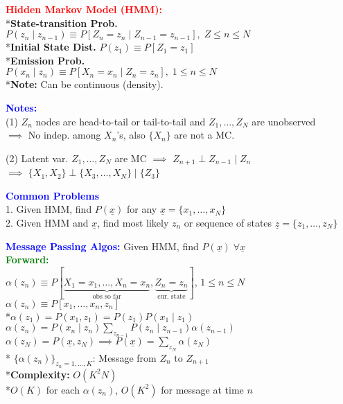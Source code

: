 \documentclass[5pt]{extarticle} %
\begin{document}
\begin{paracol}{3}
{    \textcolor{red}{\textbf{Hidden Markov Model (HMM):}} \\
    *\textbf{State-transition Prob.} \\ 
    $P(z_n \mid z_{n-1}) \equiv P[Z_n = z_n \mid Z_{n-1} = z_{n-1}], \; Z \leq n \leq N$ \\
    *\textbf{Initial State Dist.} $P(z_1) \equiv P[Z_1 = z_1]$ \\
    *\textbf{Emission Prob.} \\
    $P(x_n \mid z_n) \equiv P[X_n = x_n \mid Z_n = z_n], \; 1 \leq n \leq N$ \\
    *\textbf{Note:} Can be continuous (density).

    \textcolor{blue}{\textbf{Notes:}} \\
    (1) $Z_n$ nodes are head-to-tail or tail-to-tail and $Z_1,\ldots,Z_N$ are unobserved\\
    $\implies$ No indep. among $X_n$'s, also $\{X_n\}$ are not a MC.

    (2) Latent var. $Z_1,\ldots,Z_N$ are MC $\implies$ $Z_{n+1} \perp Z_{n-1} \mid Z_n$ \\
    $\implies$ $\{X_1,X_2\} \perp \{X_3,\ldots,X_N\} \mid \{Z_3\}$

    \textcolor{blue}{\textbf{Common Problems}} \\ 
    1. Given HMM, find $P(\underline{x})$ for any $\underline{x} = \{x_1,\ldots,x_N\}$ \\
    2. Given HMM and $\underline{x}$, find most likely $z_n$ or sequence of states $\underline{z} = \{z_1,\ldots,z_N\}$ 

    \textcolor{blue}{\textbf{Message Passing Algos:}} Given HMM, find $P(\underline{x}) \; \forall \underline{x}$ \\
    \textcolor{green}{\textbf{Forward:}} \\
    $\alpha(z_n) \equiv P[\underbrace{X_1 = x_1,\ldots,X_n=x_n}_{\text{obs so far}}, \underbrace{Z_n = z_n}_{\text{cur. state}}]$, $1 \leq n \leq N$\\
    $\alpha(z_n) \equiv P[x_1,\ldots,x_n,z_n]$ \\
    *$\alpha(z_1) = P(x_1,z_1) = P(z_1)P(x_1 \mid z_1)$ \\
    $\boxed{\alpha(z_n) = P(x_n \mid z_n) \sum_{z_{n-1}} P(z_n \mid z_{n-1}) \alpha(z_{n-1})}$ \\
    $\boxed{\alpha(z_N) = P(\underline{x}, z_N) \implies P(\underline{x}) = \sum_{z_N} \alpha(z_N)}$ \\
    * $\{\alpha(z_n)\}_{z_n = 1,\ldots,K}$: Message from $Z_n$ to $Z_{n+1}$ \\
    *\textbf{Complexity:} $O(K^2 N)$ \\
    *$O(K)$ for each $\alpha(z_n)$, $O(K^2)$ for message at time $n$

}
\end{paracol}
\end{document}
